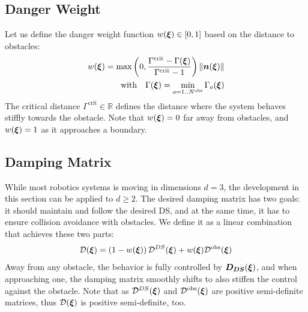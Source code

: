 \documentclass[conference]{IEEEtran}
\begin{document}

\subsection{Danger Weight}
Let us define the danger weight function $w(\boldsymbol{\xi}) \in [0, 1]$ based on the distance to obstacles:
\begin{equation}
  \begin{split}
w(\vecs\xi) =
\max \left(0,  \frac{\Gamma^{\mathrm{crit}} - \Gamma(\vecs\xi)}{\Gamma^{\mathrm{crit}} - 1} \right) \| \vecs n(\vecs \xi) \| \\
\text{with} \quad
\Gamma(\vecs\xi) = \min_{o = 1..N^{\mathrm{obs}}} \Gamma_o(\vecs\xi)
\label{eq:weight_function}
\end{split}
\end{equation}
The critical distance $\Gamma^{\mathrm{crit}} \in \mathbb{R}$ defines the distance where the system behaves stiffly towards the obstacle.
Note that $w(\boldsymbol{\xi}) = 0$ far away from obstacles, and $w(\boldsymbol{\xi}) = 1$ as it approaches a boundary.

\subsection{Damping Matrix}
While most robotics systems is moving in dimensions $d = 3$, the development in this section can be applied to $d \geq 2$.
The desired damping matrix has two goals: it should maintain and follow the desired DS, and at the same time, it has to ensure collision avoidance with obstacles. We define it as a linear combination that achieves these two parts:
\begin{equation}
    \matd D(\vecs\xi) = \left(1 - w(\vecs\xi) \right) {\matd D^{DS}}(\vecs\xi) + w(\vecs\xi)  {\matd D^{\mathrm{obs}}}(\vecs\xi) \label{eq:damping_summation}
\end{equation}
Away from any obstacle, the behavior is fully controlled by $\boldsymbol{D_{DS}}(\boldsymbol{\xi})$, and when approaching one, the damping matrix smoothly shifts to also stiffen the control against the obstacle. 
Note that as ${\mathcal{D}^{DS}}(\boldsymbol{\xi})$ and $\mathcal{D^{\mathrm{obs}}}(\boldsymbol{\xi})$ are positive semi-definite matrices, thus $\mathcal{D}(\boldsymbol{\xi})$ is positive semi-definite, too.
\end{document}
